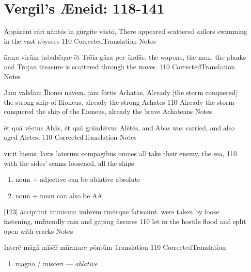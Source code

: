 \section{Vergil's {\AE}neid:  118-141} %

	\latline
	  {\=App\={\macron a}r\=ent r\={\macron a}r\={\macron \i} n\=ant\={\macron e}s \=in g\=urg\-it\-e v\=ast\={\macron o},}
	  { There appeared scattered sailors swimming in the vast abysses }
	  {110}
	  { CorrectedTranslation }
	  { Notes }



	\latline
	  {\=arm\-a v\-ir\=um t\-ab\-ul\={\ae}qu\sout{e }\=et Tr\={\macron o}\-i\-a g\=az\-a p\-er \=und\={\macron a}s.}
	  { the wapons, the man, the planks and Trojan treasure is scattered through the waves. }
	  {110}
	  { CorrectedTranslation }
	  { Notes }


	\latline
	  {J\=am v\-al\-id\=am \={\macron I}lione\={\macron \i} n\={\macron a}v\=em, j\=am f\=ort\-is \-Ach\={\macron a}t\={ae},}
	  { Already [the storm conquered] the strong ship of Ilioneus, already the strong Achates }
	  {110}
	  { Already the storm conquered the ship of the Ilioneus, already the brave Achateans }
	  { Notes }



	\latline
	  {\=et qu\={\macron a} v\=ect\-us \-Ab\={\macron a}s, \=et qu\={\macron a} gr\=and\={\ae}v\-us \-Al\={\macron e}t\={\macron e}s,}
	  { and Abas was carried, and also aged Aletes,  }
	  {110}
	  { CorrectedTranslation }
	  { Notes }



	\latline
	  {v\={\macron \i}c\-it h\-i\=ems; l\=ax\={\macron \i}s l\-at\-er\=um c\=omp\={\macron a}g\-ib\-us \=omn\={\macron e}s}
	  { all  take their enemy, the sea, }
	  {110}
	  { with the sides' seams loosened, all the ships }
	  { \begin{enumerate}
	  	\item noun + adjective can be ablative absolute
	  	\item noun + noun can also be AA
	  \end{enumerate} }


	\latline
	  {[123] \=acc\-ip\-i\=unt \-in\-im\={\macron \i}c\-um \-imbr\=em r\={\macron \i}m\={\macron \i}squ\-e f\-at\={\macron \i}sc\=unt.}
	  {  were taken by loose fastening, unfriendly rain and gaping fissures }
	  {110}
	  { let in the hostile flood and split open with cracks }
	  { Notes }


\latline
  {\=Int\-er\-e\={} m\=agn\={} m\=isc\={}r\={\macron {\i}} m\=urm\-ur\-e p\=ont\=um}
  { Translation }
  {110}
  { CorrectedTranslation }
  { \begin{enumerate}
  	\item magn\={o} / misc\={e}r\={\i} --- \emph{ablative}
  \end{enumerate} }



